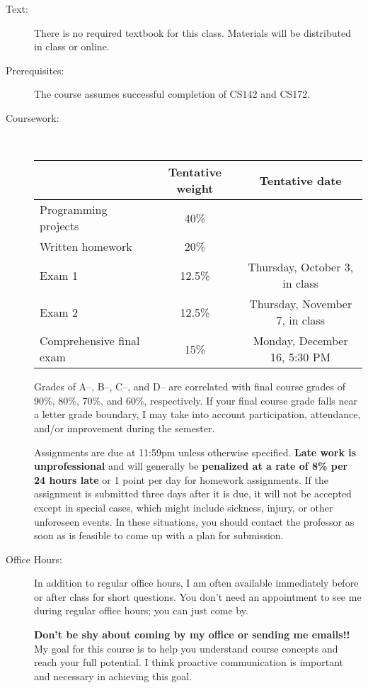 \documentclass [letterpaper,11pt]{article}
\begin{document}
\begin{description}
\item[Text:]
   There is no required textbook for this class.  Materials will be distributed in class
   or online.  

\item[Prerequisites:]
The course assumes successful completion of CS142 and CS172.

\item[Coursework:] \

\begin{tabular}{lcc} 
& Tentative weight & Tentative date \\ \hline
Programming projects & 40\% & \\
Written homework & 20\% & \\
Exam 1 & 12.5\% & Thursday, October 3, in class  \\
Exam 2 & 12.5\% & Thursday, November 7, in class\\
Comprehensive final exam & 15\% & Monday, December 16, 5:30 PM\\
\end{tabular}

Grades of A--, B--, C--, and D-- are correlated with final course grades of 90\%, 80\%,
70\%, and 60\%, respectively.  If your final course grade falls near a letter grade boundary,
I may take into account participation, attendance, and/or improvement during the semester.

Assignments are due at 11:59pm unless otherwise specified.  \textbf{Late work is unprofessional} and will generally be \textbf{penalized at a rate of 8\% per 24 hours late} or 1 point per day for homework assignments.  If the assignment is submitted three days after it is due, it will not be accepted except in special cases, which might include sickness, injury, or other unforeseen events. In these situations, you should contact the professor as soon as is feasible to come up with a plan for submission.

\item[Office Hours:]
In addition to regular office hours, I am often available immediately before or after class for 
short questions.  You don't need an appointment to see me during regular office hours; you
can just come by.  

\textbf{Don't be shy about coming by my office or sending me emails!!}  My goal for this course is to help you understand course concepts and reach your full potential. I think proactive communication is important and necessary in achieving this goal.


\end{description}
\end{document}
